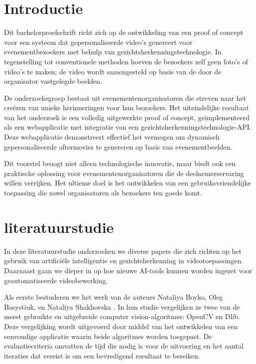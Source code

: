 
\section{Introductie}%
\label{sec:introductie}

Dit bachelorproefschrift richt zich op de ontwikkeling van een proof of concept voor een systeem dat gepersonaliseerde video's genereert voor evenementbezoekers met behulp van gezichtsherkenningstechnologie. In tegenstelling tot conventionele methoden hoeven de bezoekers zelf geen foto's of video's te maken; de video wordt samengesteld op basis van de door de organisator vastgelegde beelden.

De onderzoeksgroep bestaat uit evenementenorganisatoren die streven naar het creëren van unieke herinneringen voor hun bezoekers. Het uiteindelijke resultaat van het onderzoek is een volledig uitgewerkte proof of concept, geïmplementeerd als een webapplicatie met integratie van een gezichtsherkenningstechnologie-API. Deze webapplicatie demonstreert effectief het vermogen om dynamisch gepersonaliseerde aftermovies te genereren op basis van evenementbeelden.

Dit voorstel beoogt niet alleen technologische innovatie, maar biedt ook een praktische oplossing voor evenementenorganisatoren die de deelnemerservaring willen verrijken. Het ultieme doel is het ontwikkelen van een gebruiksvriendelijke toepassing die zowel organisatoren als bezoekers ten goede komt.


\section{literatuurstudie}%
\label{sec:state-of-the-art}
In deze literatuurstudie onderzoeken we diverse papers die zich richten op het gebruik van artificiële intelligentie en gezichtsherkenning in videotoepassingen. Daarnaast gaan we dieper in op hoe nieuwe AI-tools kunnen worden ingezet voor geautomatiseerde videobewerking.

Als eerste bestuderen we het werk van de auteurs Nataliya Boyko, Oleg Basystiuk, en Nataliya Shakhovska \autocite{Boyko2018}. In hun studie vergelijken ze twee van de meest gebruikte en uitgebreide computer vision-algoritmes: OpenCV en Dlib. Deze vergelijking wordt uitgevoerd door middel van het ontwikkelen van een eenvoudige applicatie waarin beide algoritmes worden toegepast. De evaluatiecriteria omvatten de tijd die nodig is voor de uitvoering en het aantal iteraties dat vereist is om een bevredigend resultaat te bereiken.

